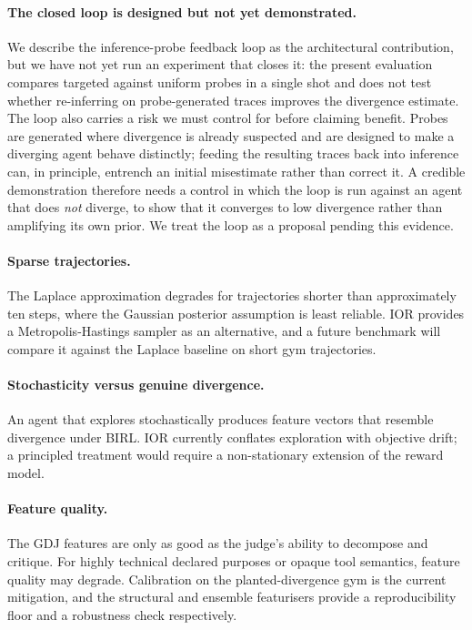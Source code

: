 \paragraph{The closed loop is designed but not yet demonstrated.}
We describe the inference-probe feedback loop as the architectural contribution, but
we have not yet run an experiment that closes it: the present evaluation compares
targeted against uniform probes in a single shot and does not test whether
re-inferring on probe-generated traces improves the divergence estimate. The loop
also carries a risk we must control for before claiming benefit. Probes are
generated where divergence is already suspected and are designed to make a diverging
agent behave distinctly; feeding the resulting traces back into inference can, in
principle, entrench an initial misestimate rather than correct it. A credible
demonstration therefore needs a control in which the loop is run against an agent
that does \emph{not} diverge, to show that it converges to low divergence rather
than amplifying its own prior. We treat the loop as a proposal pending this
evidence.

\paragraph{Sparse trajectories.}
The Laplace approximation degrades for trajectories shorter than approximately ten
steps, where the Gaussian posterior assumption is least reliable. IOR provides a
Metropolis-Hastings sampler as an alternative, and a future benchmark will compare
it against the Laplace baseline on short gym trajectories.

\paragraph{Stochasticity versus genuine divergence.}
An agent that explores stochastically produces feature vectors that resemble
divergence under BIRL. IOR currently conflates exploration with objective drift; a
principled treatment would require a non-stationary extension of the reward model.

\paragraph{Feature quality.}
The GDJ features are only as good as the judge's ability to decompose and critique.
For highly technical declared purposes or opaque tool semantics, feature quality
may degrade. Calibration on the planted-divergence gym is the current mitigation,
and the structural and ensemble featurisers provide a reproducibility floor and a
robustness check respectively.

